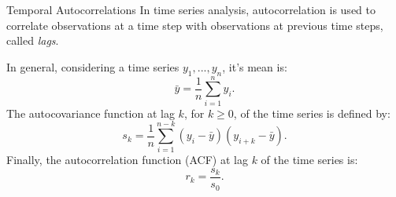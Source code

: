 \begin{comment}
\begin{frame}
\begin{figure}[!ht]
\begin{subfigure}{.5\textwidth}
  \centering
  \texttt{[image: M2\_V22\_Vrancea\_20km\_1\_mag\_10]}
  \caption{With M2(0)}
  \label{fig:corr20km}
\end{subfigure}%
\begin{subfigure}{.5\textwidth}
  \centering
  \texttt{[image: M2\_V22\_Vrancea\_20km\_1\_mag\_10\_without0]}
  \caption{Without M2(0)}
  \label{fig:corr20km_noZero}
\end{subfigure}
\caption{Spatial autocorrelation function $M2(r)$ for Vrancea seismic zone split into $20\times20\times20$ km cubes. $r$ represents the distance in multiples of $20$ km. The right hand plot, without the point $M2(0)$ better displays the feature of the plot}
\label{fig:spcorrVrancea20km}
\end{figure}
\end{frame}

\end{comment}

\begin{frame}
{Temporal Autocorrelations}
In time series analysis, autocorrelation is used to correlate observations at a time step with observations at previous time steps, called {\it lags}.\par 
In general, considering a time series $y_1,...,y_n$, it's mean is:
\begin{equation}
\bar{y}=\frac{1}{n}\sum_{i=1}^n y_i.
\end{equation}
The autocovariance function at lag $k$, for $k \geq 0$, of the time series is defined by:
\begin{equation}
s_k = \frac{1}{n}\sum_{i=1}^{n-k}(y_i - \bar{y})(y_{i+k} - \bar{y}).
\end{equation}
Finally, the autocorrelation function (ACF) at lag $k$ of the time series is:
\begin{equation}
r_k = \frac{s_k}{s_0}.
\end{equation}
\end{frame}


